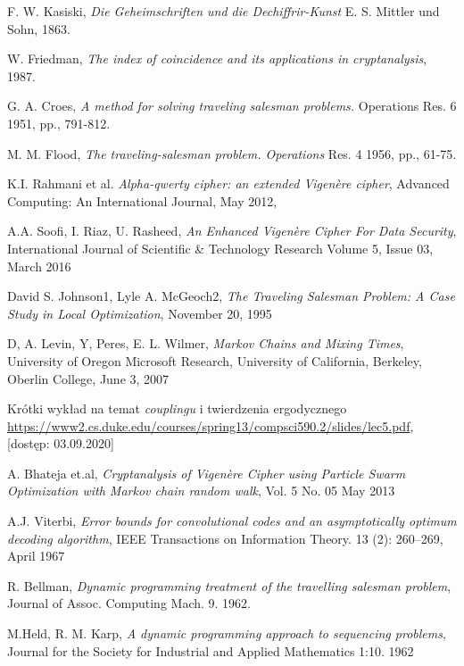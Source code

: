 \documentclass[a4paper]{article}
\theoremstyle{defn}
\theoremstyle{theorem}
\theoremstyle{lemma}
\theoremstyle{cor}
\theoremstyle{fact}
\begin{document}
\begin{thebibliography}{9}
F. W. Kasiski, \emph{Die Geheimschriften und die Dechiffrir-Kunst} E. S. Mittler und Sohn, 1863.

W. Friedman, \emph{The index of coincidence and its applications in cryptanalysis}, 1987.

 G. A. Croes, \emph{A method for solving traveling salesman problems.} Operations Res. 6 1951, pp., 791-812.
 
 M. M. Flood, \emph{The traveling-salesman problem. Operations} Res. 4 1956, pp., 61-75.
 
K.I. Rahmani et al. \emph{Alpha-qwerty cipher: an extended Vigenère cipher}, 
Advanced Computing: An International Journal,  May 2012, 

A.A. Soofi, I. Riaz, U. Rasheed,
\emph{An Enhanced Vigenère Cipher For Data Security},
International Journal of Scientific \& Technology Research Volume 5, Issue 03, March 2016 

David S. Johnson1, Lyle A. McGeoch2,
\emph{The Traveling Salesman Problem:
A Case Study in Local Optimization},
November 20, 1995

D, A. Levin, Y, Peres, E. L. Wilmer,
\emph{Markov Chains and Mixing Times},
University of Oregon Microsoft Research, 
University of California, Berkeley, 
Oberlin College, 
June 3, 2007

Krótki wykład na temat \textit{couplingu} i twierdzenia ergodycznego \href{https://www2.cs.duke.edu/courses/spring13/compsci590.2/slides/lec5.pdf}{https://www2.cs.duke.edu/courses/spring13/compsci590.2/slides/lec5.pdf}, [dostęp: 03.09.2020]

A. Bhateja et.al, \emph{Cryptanalysis of Vigenère Cipher using Particle
Swarm Optimization with Markov chain random walk}, Vol. 5 No. 05 May 2013

A.J. Viterbi,  \emph{Error bounds for convolutional codes and an asymptotically optimum decoding algorithm}, IEEE Transactions on Information Theory. 13 (2): 260–269, April 1967

 R. Bellman, \emph{Dynamic programming treatment of the travelling salesman problem}, Journal of Assoc. Computing Mach. 9. 1962.
 
 M.Held, R. M. Karp, \emph{A dynamic programming approach to sequencing problems},  Journal for the Society for Industrial and Applied Mathematics 1:10. 1962
 

\end{thebibliography}
\end{document}
